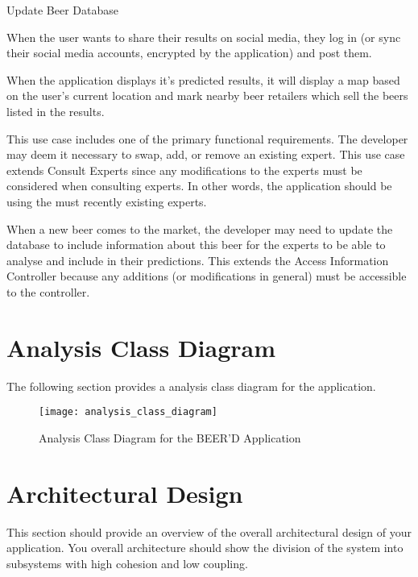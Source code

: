 \documentclass[]{article}
\begin{document}
\begin{labeling}{Update Beer Database}
\item [Share on Social Media] When the user wants to share their results on social media, they log in (or sync their social media accounts, encrypted by the application) and post them.
\item [Open Nearby Locations] When the application displays it's predicted results, it will display a map based on the user's current location and mark nearby beer retailers which sell the beers listed in the results.
\item [Edit Expert] This use case includes one of the primary functional requirements. The developer may deem it necessary to swap, add, or remove an existing expert. This use case extends Consult Experts since any modifications to the experts must be considered when consulting experts. In other words, the application should be using the must recently existing experts.
\item [Update Beer Database] When a new beer comes to the market, the developer may need to update the database to include information about this beer for the experts to be able to analyse and include in their predictions. This extends the Access Information Controller because any additions (or modifications in general) must be accessible to the controller. 
\end{labeling}

\newpage
\section{Analysis Class Diagram}
\label{sec:analysis_class_diagram}
The following section provides a analysis class diagram for the application. \\
\begin{figure}[!ht]
\texttt{[image: analysis\_class\_diagram]}
\caption{Analysis Class Diagram for the BEER'D Application}
\end{figure}



\section{Architectural Design}
\label{sec:architectural_design}
This section should provide an overview of the overall architectural design of your application. You overall architecture should show the division of the system into subsystems with high cohesion and low coupling.
\end{document}
